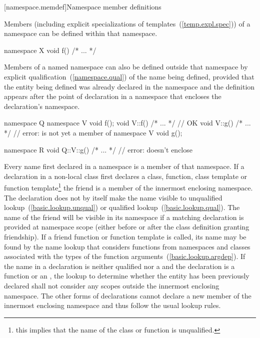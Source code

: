 [namespace.memdef]{Namespace member definitions}%

\pnum
Members (including explicit specializations of
templates~(\ref{temp.expl.spec})) of a namespace can be defined within
that namespace.
\enterexample

\begin{codeblock}
namespace X {
  void f() { /* ... */ }
}
\end{codeblock}
\exitexample

\pnum
Members of a named namespace can also be
defined outside that namespace by explicit
qualification~(\ref{namespace.qual}) of the name being defined, provided
that the entity being defined was already declared in the namespace and
the definition appears after the point of declaration in a namespace
that encloses the declaration's namespace.
\enterexample

\begin{codeblock}
namespace Q {
  namespace V {
    void f();
  }
  void V::f() { /* ... */ }     // OK
  void V::g() { /* ... */ }     // error:  is not yet a member of 
  namespace V {
    void g();
  }
}

namespace R {
  void Q::V::g() { /* ... */ }  // error:  doesn't enclose 
}
\end{codeblock}
\exitexample

\pnum
Every name first declared in a namespace is a member of that namespace.
If a  declaration in a non-local class first declares a
class, function, class template or function template\footnote{this implies that the name of the class or function is unqualified.}
the friend is a member of the innermost enclosing
namespace. The  declaration does not by itself make the name
visible to unqualified lookup~(\ref{basic.lookup.unqual}) or qualified
lookup~(\ref{basic.lookup.qual}). \enternote The name of the friend will be
visible in its namespace if a matching declaration is provided at namespace
scope (either before or after the class definition granting friendship).
\exitnote If a friend
function or function template is called, its name may be found by the
name lookup that considers functions from namespaces and classes
associated with the types of the function
arguments~(\ref{basic.lookup.argdep}). If the
name in a  declaration is neither qualified nor a
 and the declaration is a function or an
, the lookup to determine whether
the entity has been previously declared shall not consider any scopes
outside the innermost enclosing namespace. \enternote The other forms of
 declarations cannot declare a new member of the innermost
enclosing namespace and thus follow the usual lookup rules.
\exitnote
\enterexample


